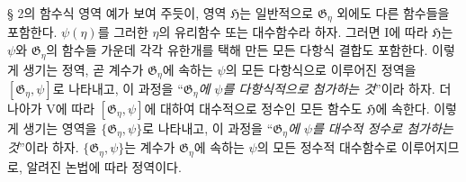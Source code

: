 
§ 2의 함수식 영역 예가 보여 주듯이, 영역 $\mathfrak H$는 일반적으로 $\mathfrak G_\eta$ 외에도 다른 함수들을 포함한다. $\psi(\eta)$를 그러한 $\eta$의 유리함수 또는 대수함수라 하자. 그러면 I에 따라 $\mathfrak H$는 $\psi$와 $\mathfrak G_\eta$의 함수들 가운데 각각 유한개를 택해 만든 모든 다항식 결합도 포함한다. 이렇게 생기는 정역, 곧 계수가 $\mathfrak G_\eta$에 속하는 $\psi$의 모든 다항식으로 이루어진 정역을 $[\mathfrak G_\eta,\psi]$로 나타내고, 이 과정을 ``\emph{$\mathfrak G_\eta$에 $\psi$를 다항식적으로 첨가하는 것}''이라 하자. 더 나아가 V에 따라 $[\mathfrak G_\eta,\psi]$에 대하여 대수적으로 정수인 모든 함수도 $\mathfrak H$에 속한다. 이렇게 생기는 영역을 $\{\mathfrak G_\eta,\psi\}$로 나타내고, 이 과정을 ``\emph{$\mathfrak G_\eta$에 $\psi$를 대수적 정수로 첨가하는 것}''이라 하자. $\{\mathfrak G_\eta,\psi\}$는 계수가 $\mathfrak G_\eta$에 속하는 $\psi$의 모든 정수적 대수함수로 이루어지므로, 알려진 논법에 따라 정역이다.
